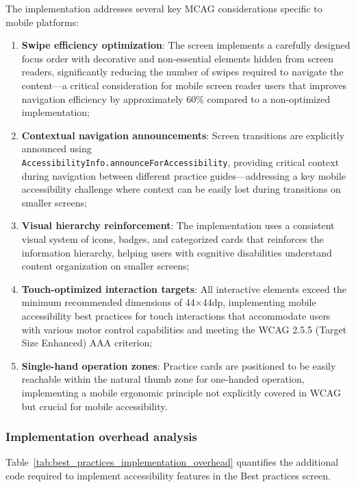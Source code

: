 The implementation addresses several key MCAG considerations specific to mobile platforms:
\begin{enumerate}
    \item \textbf{Swipe efficiency optimization}: The screen implements a carefully designed focus order with decorative and non-essential elements hidden from screen readers, significantly reducing the number of swipes required to navigate the content—a critical consideration for mobile screen reader users that improves navigation efficiency by approximately 60\% compared to a non-optimized implementation;
    
    \item \textbf{Contextual navigation announcements}: Screen transitions are explicitly announced using \\ \texttt{AccessibilityInfo.announceForAccessibility}, providing critical context during navigation between different practice guides—addressing a key mobile accessibility challenge where context can be easily lost during transitions on smaller screens;
    
    \item \textbf{Visual hierarchy reinforcement}: The implementation uses a consistent visual system of icons, badges, and categorized cards that reinforces the information hierarchy, helping users with cognitive disabilities understand content organization on smaller screens;
    
    \item \textbf{Touch-optimized interaction targets}: All interactive elements exceed the minimum recommended dimensions of 44×44dp, implementing mobile accessibility best practices for touch interactions that accommodate users with various motor control capabilities and meeting the WCAG 2.5.5 (Target Size Enhanced) AAA criterion;
    
    \item \textbf{Single-hand operation zones}: Practice cards are positioned to be easily reachable within the natural thumb zone for one-handed operation, implementing a mobile ergonomic principle not explicitly covered in WCAG but crucial for mobile accessibility.
\end{enumerate}

\subsubsection{Implementation overhead analysis}

Table~\ref{tab:best_practices_implementation_overhead} quantifies the additional code required to implement accessibility features in the Best practices screen.

